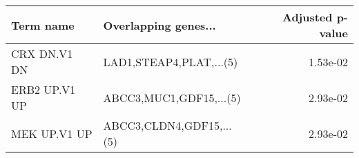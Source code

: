 \begin{tabular}{llr}
\toprule
    Term name &     Overlapping genes... &  Adjusted p-value \\
\midrule
 CRX DN.V1 DN &  LAD1,STEAP4,PLAT,...(5) &          1.53e-02 \\
ERB2 UP.V1 UP &  ABCC3,MUC1,GDF15,...(5) &          2.93e-02 \\
 MEK UP.V1 UP & ABCC3,CLDN4,GDF15,...(5) &          2.93e-02 \\
\bottomrule
\end{tabular}
